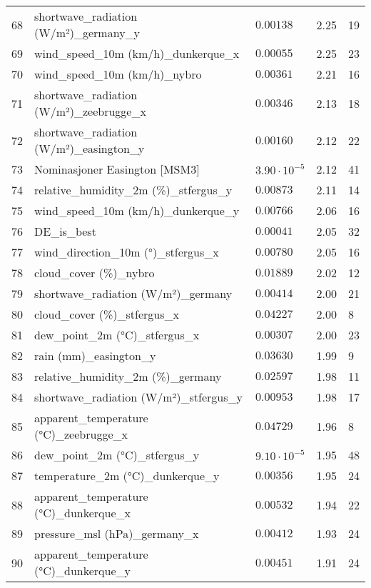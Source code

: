 \begin{table}[H]
\begin{tabular}{r l l l l}
        68 & shortwave\_radiation (W/m²)\_germany\_y & $0.00138$ & 2.25 & 19 \\
        69 & wind\_speed\_10m (km/h)\_dunkerque\_x & $0.00055$ & 2.25 & 23 \\
        70 & wind\_speed\_10m (km/h)\_nybro & $0.00361$ & 2.21 & 16 \\
        71 & shortwave\_radiation (W/m²)\_zeebrugge\_x & $0.00346$ & 2.13 & 18 \\
        72 & shortwave\_radiation (W/m²)\_easington\_y & $0.00160$ & 2.12 & 22 \\
        73 & Nominasjoner Easington [MSM3] & $3.90 \cdot 10^{-5}$ & 2.12 & 41 \\
        74 & relative\_humidity\_2m (\%)\_stfergus\_y & $0.00873$ & 2.11 & 14 \\
        75 & wind\_speed\_10m (km/h)\_dunkerque\_y & $0.00766$ & 2.06 & 16 \\
        76 & DE\_is\_best & $0.00041$ & 2.05 & 32 \\
        77 & wind\_direction\_10m (°)\_stfergus\_x & $0.00780$ & 2.05 & 16 \\
        78 & cloud\_cover (\%)\_nybro & $0.01889$ & 2.02 & 12 \\
        79 & shortwave\_radiation (W/m²)\_germany & $0.00414$ & 2.00 & 21 \\
        80 & cloud\_cover (\%)\_stfergus\_x & $0.04227$ & 2.00 & 8 \\
        81 & dew\_point\_2m (°C)\_stfergus\_x & $0.00307$ & 2.00 & 23 \\
        82 & rain (mm)\_easington\_y & $0.03630$ & 1.99 & 9 \\
        83 & relative\_humidity\_2m (\%)\_germany & $0.02597$ & 1.98 & 11 \\
        84 & shortwave\_radiation (W/m²)\_stfergus\_y & $0.00953$ & 1.98 & 17 \\
        85 & apparent\_temperature (°C)\_zeebrugge\_x & $0.04729$ & 1.96 & 8 \\
        86 & dew\_point\_2m (°C)\_stfergus\_y & $9.10 \cdot 10^{-5}$ & 1.95 & 48 \\
        87 & temperature\_2m (°C)\_dunkerque\_y & $0.00356$ & 1.95 & 24 \\
        88 & apparent\_temperature (°C)\_dunkerque\_x & $0.00532$ & 1.94 & 22 \\
        89 & pressure\_msl (hPa)\_germany\_x & $0.00412$ & 1.93 & 24 \\
        90 & apparent\_temperature (°C)\_dunkerque\_y & $0.00451$ & 1.91 & 24 \\

\end{tabular}
\end{table}
